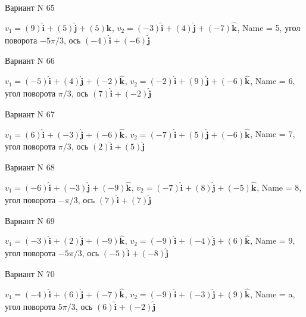 \documentclass[11pt]{report}
\begin{document}
Вариант N 65

$v_1 = \left(9\right)\mathbf{\hat{i}_{}} + \left(5\right)\mathbf{\hat{j}_{}} + \left(5\right)\mathbf{\hat{k}_{}}$, $v_2 = \left(-3\right)\mathbf{\hat{i}_{}} + \left(4\right)\mathbf{\hat{j}_{}} + \left(-7\right)\mathbf{\hat{k}_{}}$, Name = 5, угол поворота $- 5 \pi / 3$, ось $\left(-4\right)\mathbf{\hat{i}_{}} + \left(-6\right)\mathbf{\hat{j}_{}}$

Вариант N 66

$v_1 = \left(-5\right)\mathbf{\hat{i}_{}} + \left(4\right)\mathbf{\hat{j}_{}} + \left(-2\right)\mathbf{\hat{k}_{}}$, $v_2 = \left(-2\right)\mathbf{\hat{i}_{}} + \left(9\right)\mathbf{\hat{j}_{}} + \left(-6\right)\mathbf{\hat{k}_{}}$, Name = 6, угол поворота $\pi / 3$, ось $\left(7\right)\mathbf{\hat{i}_{}} + \left(-2\right)\mathbf{\hat{j}_{}}$

Вариант N 67

$v_1 = \left(6\right)\mathbf{\hat{i}_{}} + \left(-3\right)\mathbf{\hat{j}_{}} + \left(-6\right)\mathbf{\hat{k}_{}}$, $v_2 = \left(-7\right)\mathbf{\hat{i}_{}} + \left(5\right)\mathbf{\hat{j}_{}} + \left(-6\right)\mathbf{\hat{k}_{}}$, Name = 7, угол поворота $\pi / 3$, ось $\left(2\right)\mathbf{\hat{i}_{}} + \left(5\right)\mathbf{\hat{j}_{}}$

Вариант N 68

$v_1 = \left(-6\right)\mathbf{\hat{i}_{}} + \left(-3\right)\mathbf{\hat{j}_{}} + \left(-9\right)\mathbf{\hat{k}_{}}$, $v_2 = \left(-7\right)\mathbf{\hat{i}_{}} + \left(8\right)\mathbf{\hat{j}_{}} + \left(-5\right)\mathbf{\hat{k}_{}}$, Name = 8, угол поворота $- \pi / 3$, ось $\left(7\right)\mathbf{\hat{i}_{}} + \left(7\right)\mathbf{\hat{j}_{}}$

Вариант N 69

$v_1 = \left(-3\right)\mathbf{\hat{i}_{}} + \left(2\right)\mathbf{\hat{j}_{}} + \left(-9\right)\mathbf{\hat{k}_{}}$, $v_2 = \left(-9\right)\mathbf{\hat{i}_{}} + \left(-4\right)\mathbf{\hat{j}_{}} + \left(6\right)\mathbf{\hat{k}_{}}$, Name = 9, угол поворота $- 5 \pi / 3$, ось $\left(-5\right)\mathbf{\hat{i}_{}} + \left(-8\right)\mathbf{\hat{j}_{}}$

Вариант N 70

$v_1 = \left(-4\right)\mathbf{\hat{i}_{}} + \left(6\right)\mathbf{\hat{j}_{}} + \left(-7\right)\mathbf{\hat{k}_{}}$, $v_2 = \left(-9\right)\mathbf{\hat{i}_{}} + \left(-3\right)\mathbf{\hat{j}_{}} + \left(9\right)\mathbf{\hat{k}_{}}$, Name = a, угол поворота $5 \pi / 3$, ось $\left(6\right)\mathbf{\hat{i}_{}} + \left(-2\right)\mathbf{\hat{j}_{}}$
\end{document}
